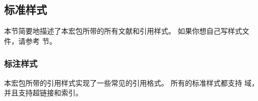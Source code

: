 \subsection{标准样式}
\label{use:xbx}


本节简要地描述了本宏包所带的所有文献和引用样式。
如果你想自己写样式文件，请参考  节。

\subsubsection{标注样式}%
\label{use:xbx:cbx}


本宏包所带的引用样式实现了一些常见的引用格式。
所有的标准样式都支持  域，并且支持超链接和索引。


